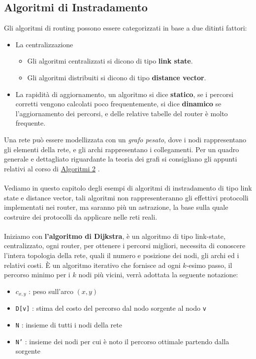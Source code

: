 \documentclass[12pt, letterpaper]{article}
\newcommand{\codee}[1]{\colorbox{white}{\texttt{#1}}}
\newcommand{\acc}{\\\hphantom{}\\}
\begin{document}
\subsection{Algoritmi di Instradamento}
Gli algoritmi di routing possono essere categorizzati in base a due ditinti fattori: \begin{itemize}
    \item La centralizzazione \begin{itemize}
        \item Gli algoritmi centralizzati si dicono di tipo \textbf{link state}.
        \item Gli algoritmi distribuiti si dicono di tipo \textbf{distance vector}.
    \end{itemize}
    \item La rapidità di aggiornamento, un algoritmo si dice \textbf{statico}, se i percorsi corretti vengono 
    calcolati poco frequentemente, si dice \textbf{dinamico} se l'aggiornamento dei percorsi, e delle relative 
    tabelle del router è molto frequente.
\end{itemize}
Una rete può essere modellizzata con un \textit{grafo pesato}, dove i nodi rappresentano gli elementi della rete, 
e gli archi rappresentano i collegamenti. Per un quadro generale e dettagliato riguardante la teoria dei grafi 
si consigliano gli appunti relativi al corso di 
\color{blue}\href{https://github.com/CasuFrost/University_notes/blob/main/Secondo%20Anno/Secondo%20Semestre/Progettazione%20di%20Algoritmi/Latex%20source%20file/Progettazione%20di%20Algoritmi.pdf}{Algoritmi 2}
\color{black}.
\acc
Vediamo in questo capitolo degli esempi di algoritmi di instradamento di tipo link state e distance vector, tali algoritmi 
non rappresenteranno gli effettivi protocolli implementati nei router, ma saranno più un astrazione, la base sulla 
quale costruire dei protocolli da applicare nelle reti reali.\acc 
Iniziamo con \textbf{l'algoritmo di Dijkstra}, è un algoritmo di tipo link-state, centralizzato, ogni router, per ottenere 
i percorsi migliori, necessita di conoscere l'intera topologia della rete, quali il numero e posizione dei nodi, gli 
archi ed i relativi costi. 
È un algoritmo iterativo che fornisce ad ogni $k$-esimo  passo, il percorso minimo per i $k$ nodi più vicini, verrà 
adottata la seguente notazione:
\begin{itemize}
    \item $c_{x,y}$ : peso sull'arco $(x,y)$
    \item \codee{D[v]} : stima del costo del percorso dal nodo sorgente al nodo \codee{v}
    \item \codee{N} : insieme di tutti i nodi della rete
    \item \codee{N'} : insieme dei nodi per cui è noto il percorso ottimale partendo dalla sorgente
\end{itemize} 
\end{document}
